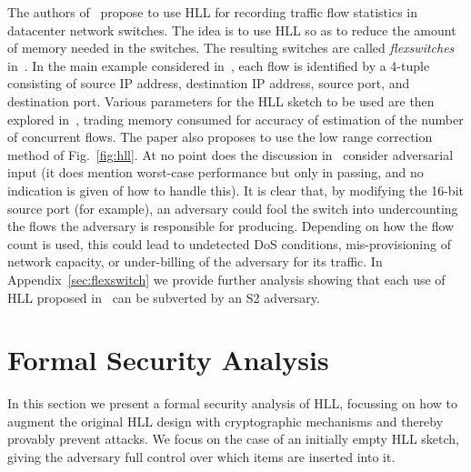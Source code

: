 \documentclass[sigconf, anonymous, dvipsnames]{acmart} %
\begin{document}
The authors of~\cite{flexswitch} propose to use HLL for recording traffic flow statistics in datacenter network switches. The idea is to use HLL so as to reduce the amount of memory needed in the switches. The resulting switches are called \emph{flexswitches} in~\cite{flexswitch}. In the main example considered in~\cite[Section 3.1]{flexswitch}, each flow is identified by a 4-tuple consisting of source IP address, destination IP address, source port, and destination port. Various parameters for the HLL sketch to be used are then explored in~\cite{flexswitch}, trading memory consumed for accuracy of estimation of the number of concurrent flows. The paper also proposes to use the low range correction method of Fig.~\ref{fig:hll}. At no point does the discussion in~\cite{flexswitch} consider adversarial input (it does mention worst-case performance but only in passing, and no indication is given of how to handle this). It is clear that, by modifying the 16-bit source port (for example), an adversary could fool the switch into undercounting the flows the adversary is responsible for producing. Depending on how the flow count is used, this could lead to undetected DoS conditions, mis-provisioning of network capacity, or under-billing of the adversary for its traffic. In Appendix~\ref{sec:flexswitch} we provide further analysis showing that each use of HLL proposed in~\cite{flexswitch} can be subverted by an S2 adversary.



\section{Formal Security Analysis}\label{sec:formal}

In this section we present a formal security analysis of HLL, focussing on how to augment the original HLL design with cryptographic mechanisms and thereby provably prevent attacks. We focus on the case of an initially empty HLL sketch, giving the adversary full control over which items are inserted into it.
\end{document}
